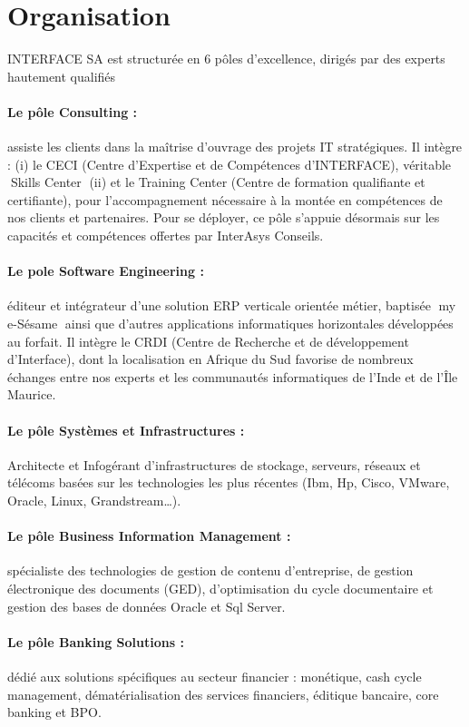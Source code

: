 \section{Organisation}
INTERFACE SA est structurée en 6 pôles d’excellence, dirigés par des experts hautement qualifiés 
\paragraph{Le pôle Consulting :} assiste les clients dans la maîtrise d’ouvrage des projets IT stratégiques. Il intègre : (i) le CECI (Centre d’Expertise et de Compétences d’INTERFACE), véritable Skills Center (ii) et le Training Center (Centre de formation qualifiante et certifiante), pour l’accompagnement nécessaire à la montée en compétences de nos clients et partenaires. Pour se déployer, ce pôle s’appuie désormais sur les capacités et compétences offertes par InterAsys Conseils. 
\paragraph{Le pole Software Engineering :} éditeur et intégrateur d’une solution ERP verticale orientée métier, baptisée my e-Sésame ainsi que  d’autres applications informatiques horizontales développées au forfait. Il intègre le CRDI (Centre de Recherche et de développement d’Interface), dont la localisation en Afrique du Sud favorise de nombreux échanges entre nos experts et les communautés informatiques de l’Inde et de l’Île Maurice.

\paragraph{Le pôle Systèmes et Infrastructures :} Architecte et Infogérant d’infrastructures de stockage, serveurs, réseaux et télécoms basées sur les technologies les plus récentes (Ibm, Hp, Cisco, VMware, Oracle, Linux, Grandstream…).

\paragraph{Le pôle Business Information Management :} spécialiste des technologies de gestion de contenu d’entreprise, de gestion électronique des documents (GED), d’optimisation du cycle documentaire et gestion des bases de données Oracle et Sql Server.

\paragraph{Le pôle Banking Solutions :} dédié aux solutions spécifiques au secteur financier : monétique, cash cycle management, dématérialisation des services financiers, éditique bancaire, core banking et BPO.

